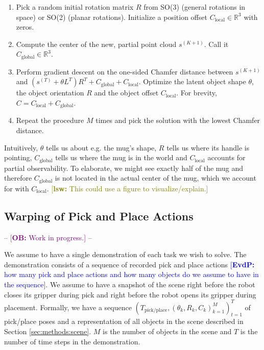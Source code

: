 \documentclass{article}
\newcommand{\ob}[1]{\textcolor{purple}{[\textbf{OB:} #1]}}
\newcommand{\evdp}[1]{\textcolor{blue}{[\textbf{EvdP:} #1]}}
\newcommand{\lsw}[1]{\textcolor{olive}{[\textbf{lsw:} #1]}}
\begin{document}
\begin{enumerate}
    \item Pick a random initial rotation matrix $R$ from SO(3) (general rotations in space) or SO(2) (planar rotations). Initialize a position offset $C_{\text{local}} \in \mathbb{R}^3$ with zeros.
    \item Compute the center of the new, partial point cloud $s^{(K+1)}$. Call it $C_{\text{global}} \in \mathbb{R}^3$.
    \item Perform gradient descent on the one-sided Chamfer distance between $s^{(K+1)}$ and $(s^{(T)} + \theta L^T) R^T + C_{\text{global}} + C_{\text{local}}$. Optimize the latent object shape $\theta$, the object orientation $R$ and the object offset $C_{\text{local}}$. For brevity, $C = C_{\text{local}} + C_{\text{global}}$.
    \item Repeat the procedure $M$ times and pick the solution with the lowest Chamfer distance.
\end{enumerate}

Intuitively, $\theta$ tells us about e.g. the mug's shape, $R$ tells us where its handle is pointing, $C_{\text{global}}$ tells us where the mug is in the world and $C_{\text{local}}$ accounts for partial observability. To elaborate, we might see exactly half of the mug and therefore $C_{\text{global}}$ is not located in the actual center of the mug, which we account for with $C_{\text{local}}$.
\lsw{This could use a figure to visualize/explain.}

\subsection{Warping of Pick and Place Actions}
\label{sec:methods:cloning}

-- \ob{Work in progress.} --

We assume to have a single demonstration of each task we wish to solve. The demonstration consists of a sequence of recorded pick and place actions \evdp{how many pick and place actions and how many objects do we assume to have in the sequence}. We assume to have a snapshot of the scene right before the robot closes its gripper during pick and right before the robot opens its gripper during placement. Formally, we have a sequence $\left(T_{\text{pick/place}}, (\theta_k, R_k, C_k)_{k=1}^M\right)_{t=1}^T$ of pick/place poses and a representation of all objects in the scene described in Section \ref{sec:methods:scene}. $M$ is the number of objects in the scene and $T$ is the number of time steps in the demonstration.
\end{document}

